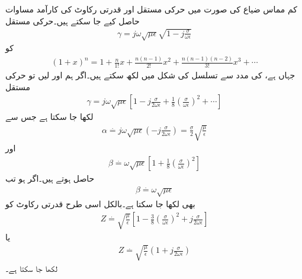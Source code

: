 کم مماس ضیاع کی صورت میں حرکی مستقل اور قدرتی رکاوٹ کی کارآمد مساوات حاصل کیے جا سکتے ہیں۔حرکی مستقل
\begin{align*}
\gamma = j \omega \sqrt{\mu \epsilon}\sqrt{1-j \frac{\sigma}{\omega \epsilon}}
\end{align*}
کو 
\begin{align*}
(1+x)^n=1+\frac{n}{1!}x+\frac{n(n-1)}{2!}x^2+\frac{n(n-1)(n-2)}{3!}x^3+\cdots
\end{align*}
جہاں  ہے، کی مدد سے  تسلسل کی شکل میں لکھ سکتے ہیں۔اگر ہم  اور  لیں تو حرکی مستقل 
\begin{align*}
\gamma=j \omega \sqrt{\mu \epsilon} \left[1-j\frac{\sigma}{2\omega \epsilon}+\frac{1}{8}\left(\frac{\sigma}{\omega \epsilon}\right)^2+\cdots \right]
\end{align*}
 لکھا جا سکتا ہے جس سے
\begin{align}\label{مساوات_موج_تضعیفی_سادہ}
\alpha \overset{.}{=} j \omega \sqrt{\mu \epsilon} \left(-j\frac{\sigma}{2\omega \epsilon} \right)=\frac{\sigma}{2}\sqrt{\frac{\mu}{\epsilon}}
\end{align}
اور 
\begin{align}\label{مساوات_موج_زاویائی_سادہ_الف}
\beta \overset{.}{=}\omega \sqrt{\mu \epsilon}\left[1+\frac{1}{8}\left(\frac{\sigma}{\omega \epsilon}\right)^2 \right]
\end{align}
حاصل ہوتے ہیں۔اگر  ہو تب
\begin{align}\label{مساوات_موج_زاویائی_سادہ_ب}
\beta \overset{.}{=}\omega \sqrt{\mu \epsilon}
\end{align}
بھی لکھا جا سکتا ہے۔بالکل اسی طرح قدرتی رکاوٹ کو
\begin{align}\label{مساوات_موج_رکاوٹ_سادہ_الف}
Z \overset{.}{=} \sqrt{\frac{\mu}{\epsilon}} \left[1-\frac{3}{8}\left(\frac{\sigma}{\omega \epsilon}\right)^2 +j \frac{\sigma}{2\omega \epsilon}\right]
\end{align}
یا
\begin{align}\label{مساوات_موج_رکاوٹ_سادہ_ب}
Z \overset{.}{=} \sqrt{\frac{\mu}{\epsilon}} \left(1 +j \frac{\sigma}{2\omega \epsilon}\right)
\end{align}
لکھا جا سکتا ہے۔

